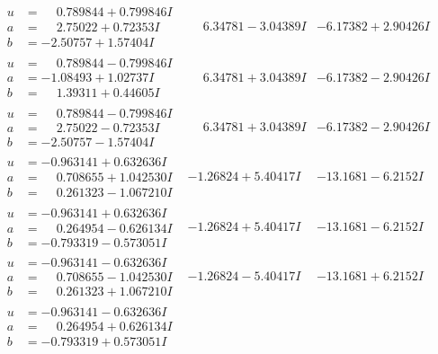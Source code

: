 \documentclass[1p]{elsarticle_modified}
\theoremstyle{definition}
\begin{document}
$$\begin{array}{c|c|c}
\begin{aligned}
u &= \phantom{-}0.789844 + 0.799846 I \\
a &= \phantom{-}2.75022 + 0.72353 I \\
b &= -2.50757 + 1.57404 I\end{aligned}
 & \phantom{-}6.34781 - 3.04389 I & -6.17382 + 2.90426 I \\ \hline\begin{aligned}
u &= \phantom{-}0.789844 - 0.799846 I \\
a &= -1.08493 + 1.02737 I \\
b &= \phantom{-}1.39311 + 0.44605 I\end{aligned}
 & \phantom{-}6.34781 + 3.04389 I & -6.17382 - 2.90426 I \\ \hline\begin{aligned}
u &= \phantom{-}0.789844 - 0.799846 I \\
a &= \phantom{-}2.75022 - 0.72353 I \\
b &= -2.50757 - 1.57404 I\end{aligned}
 & \phantom{-}6.34781 + 3.04389 I & -6.17382 - 2.90426 I \\ \hline\begin{aligned}
u &= -0.963141 + 0.632636 I \\
a &= \phantom{-}0.708655 + 1.042530 I \\
b &= \phantom{-}0.261323 - 1.067210 I\end{aligned}
 & -1.26824 + 5.40417 I & -13.1681 - 6.2152 I \\ \hline\begin{aligned}
u &= -0.963141 + 0.632636 I \\
a &= \phantom{-}0.264954 - 0.626134 I \\
b &= -0.793319 - 0.573051 I\end{aligned}
 & -1.26824 + 5.40417 I & -13.1681 - 6.2152 I \\ \hline\begin{aligned}
u &= -0.963141 - 0.632636 I \\
a &= \phantom{-}0.708655 - 1.042530 I \\
b &= \phantom{-}0.261323 + 1.067210 I\end{aligned}
 & -1.26824 - 5.40417 I & -13.1681 + 6.2152 I \\ \hline\begin{aligned}
u &= -0.963141 - 0.632636 I \\
a &= \phantom{-}0.264954 + 0.626134 I \\
b &= -0.793319 + 0.573051 I\end{aligned}

\end{array}$$
\end{document}
